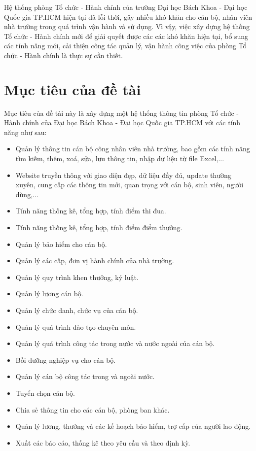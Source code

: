 Hệ thống phòng Tổ chức - Hành chính của trường Đại học Bách Khoa - Đại học Quốc gia TP.HCM hiện tại đã lỗi thời, gây nhiều khó khăn cho cán bộ, nhân viên nhà trường trong quá trình vận hành và sử dụng. Vì vậy, việc xây dựng hệ thống Tổ chức - Hành chính mới để giải quyết được các các khó khăn hiện tại, bổ sung các tính năng mới, cải thiện công tác quản lý, vận hành công việc của phòng Tổ chức - Hành chính là thực sự cần thiết.
    
\section{Mục tiêu của đề tài}
Mục tiêu của đề tài này là xây dựng một hệ thống thông tin phòng Tổ chức - Hành chính của Đại học Bách Khoa - Đại học Quốc gia TP.HCM với các tính năng như sau:

\begin{itemize}
    \item Quản lý thông tin cán bộ công nhân viên nhà trường, bao gồm các tính năng tìm kiếm, thêm, xoá, sửa, lưu thông tin, nhập dữ liệu từ file Excel,...
    \item Website truyền thông với giao diện đẹp, dữ liệu đầy đủ, update thường xuyên, cung cấp các thông tin mới, quan trọng với cán bộ, sinh viên, người dùng,... 
    \item Tính năng thống kê, tổng hợp, tính điểm thi đua.
    \item Tính năng thống kê, tổng hợp, tính điểm điểm thưởng.
    \item Quản lý bảo hiểm cho cán bộ.
    \item Quản lý các cấp, đơn vị hành chính của nhà trường.
    \item Quản lý quy trình khen thưởng, kỷ luật.
    \item Quản lý lương cán bộ.
    \item Quản lý chức danh, chức vụ của cán bộ.
    \item Quản lý quá trình đào tạo chuyên môn.
    \item Quản lý quá trình công tác trong nước và nước ngoài của cán bộ.
    \item Bồi dưỡng nghiệp vụ cho cán bộ.
    \item Quản lý cán bộ công tác trong và ngoài nước.
    \item Tuyển chọn cán bộ.
    \item Chia sẻ thông tin cho các cán bộ, phòng ban khác.
    \item Quản lý lương, thưởng và các kế hoạch bảo hiểm, trợ cấp của người lao động.
    \item Xuất các báo cáo, thống kê theo yêu cầu và theo định kỳ.
\end{itemize}
